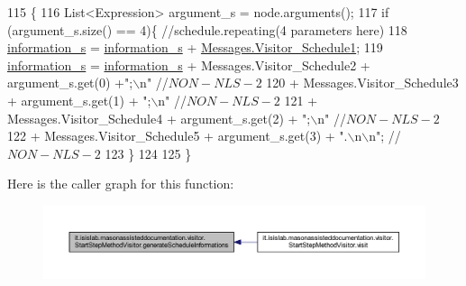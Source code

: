 \begin{DoxyCode}
115                                                                      \{
116         List<Expression> argument\_s = node.arguments();
117         \textcolor{keywordflow}{if} (argument\_s.size() == 4)\{    \textcolor{comment}{//schedule.repeating(4 parameters here)}
118             \hyperlink{classit_1_1isislab_1_1masonassisteddocumentation_1_1visitor_1_1_code_visitor_a628ab846d2f4de647f171060ebe73774}{information\_s} = \hyperlink{classit_1_1isislab_1_1masonassisteddocumentation_1_1visitor_1_1_code_visitor_a628ab846d2f4de647f171060ebe73774}{information\_s} + 
      \hyperlink{classit_1_1isislab_1_1masonassisteddocumentation_1_1visitor_1_1_messages_ac61d1feeb17b84bebc8eb84a49532bb7}{Messages.Visitor\_Schedule1};
119             \hyperlink{classit_1_1isislab_1_1masonassisteddocumentation_1_1visitor_1_1_code_visitor_a628ab846d2f4de647f171060ebe73774}{information\_s} = \hyperlink{classit_1_1isislab_1_1masonassisteddocumentation_1_1visitor_1_1_code_visitor_a628ab846d2f4de647f171060ebe73774}{information\_s} + Messages.Visitor\_Schedule2 + 
      argument\_s.get(0) +\textcolor{stringliteral}{";\(\backslash\)n"} \textcolor{comment}{//$NON-NLS-2$}
120                                 + Messages.Visitor\_Schedule3 + argument\_s.get(1) + \textcolor{stringliteral}{";\(\backslash\)n"} \textcolor{comment}{//$NON-NLS-2$}
121                                 + Messages.Visitor\_Schedule4 + argument\_s.get(2) + \textcolor{stringliteral}{";\(\backslash\)n"} \textcolor{comment}{//$NON-NLS-2$}
122                                 + Messages.Visitor\_Schedule5 + argument\_s.get(3) + \textcolor{stringliteral}{".\(\backslash\)n\(\backslash\)n"}; \textcolor{comment}{//$NON-NLS-2$}
123         \}
124         
125     \}
\end{DoxyCode}


Here is the caller graph for this function\-:
\nopagebreak
\begin{figure}[H]
\begin{center}
\leavevmode
\includegraphics[width=350pt]{classit_1_1isislab_1_1masonassisteddocumentation_1_1visitor_1_1_start_step_method_visitor_a70d875f061a61b2a52bc3c3715d5a2c7_icgraph}
\end{center}
\end{figure}


